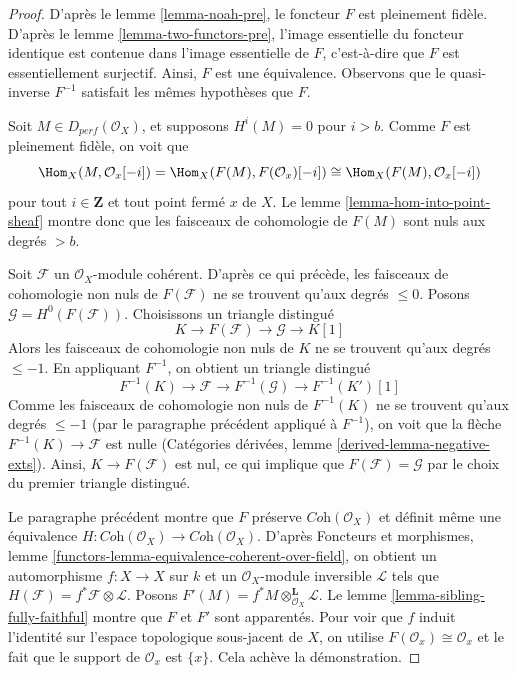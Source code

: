 \begin{proof}
D'après le lemme \ref{lemma-noah-pre}, le foncteur $F$ est pleinement fidèle.
D'après le lemme \ref{lemma-two-functors-pre}, l'image essentielle du
foncteur identique est contenue dans l'image essentielle de $F$, c'est-à-dire
que $F$ est essentiellement surjectif. Ainsi, $F$ est une équivalence.
Observons que le quasi-inverse $F^{-1}$ satisfait les mêmes hypothèses
que $F$.

\medskip\noindent
Soit $M \in D_{perf}(\mathcal{O}_X)$, et supposons $H^i(M) = 0$ pour $i > b$.
Comme $F$ est pleinement fidèle, on voit que
$$
\Hom_X(M, \mathcal{O}_x[-i]) =
\Hom_X(F(M), F(\mathcal{O}_x)[-i]) \cong
\Hom_X(F(M), \mathcal{O}_x[-i])
$$
pour tout $i \in \mathbf{Z}$ et tout point fermé $x$ de $X$.
Le lemme \ref{lemma-hom-into-point-sheaf} montre donc que les faisceaux de cohomologie de $F(M)$
sont nuls aux degrés $> b$.

\medskip\noindent
Soit $\mathcal{F}$ un $\mathcal{O}_X$-module cohérent. D'après
ce qui précède, les faisceaux de cohomologie non nuls de $F(\mathcal{F})$
ne se trouvent qu'aux degrés $\leq 0$.
Posons $\mathcal{G} = H^0(F(\mathcal{F}))$. Choisissons un triangle
distingué
$$
K \to F(\mathcal{F}) \to \mathcal{G} \to K[1]
$$
Alors les faisceaux de cohomologie non nuls de $K$ ne se trouvent qu'aux
degrés $\leq -1$.
En appliquant $F^{-1}$, on obtient un triangle distingué
$$
F^{-1}(K) \to \mathcal{F} \to F^{-1}(\mathcal{G}) \to F^{-1}(K')[1]
$$
Comme les faisceaux de cohomologie non nuls de $F^{-1}(K)$ ne se trouvent qu'aux
degrés $\leq -1$ (par le paragraphe précédent appliqué à $F^{-1}$),
on voit que la flèche $F^{-1}(K) \to \mathcal{F}$ est nulle
(Catégories dérivées, lemme \ref{derived-lemma-negative-exts}).
Ainsi, $K \to F(\mathcal{F})$ est nul, ce qui implique
que $F(\mathcal{F}) = \mathcal{G}$ par le choix du
premier triangle distingué.

\medskip\noindent
Le paragraphe précédent montre que $F$ préserve
$\textit{Coh}(\mathcal{O}_X)$ et définit même une équivalence
$H : \textit{Coh}(\mathcal{O}_X) \to \textit{Coh}(\mathcal{O}_X)$.
D'après Foncteurs et morphismes, lemme
\ref{functors-lemma-equivalence-coherent-over-field},
on obtient un automorphisme $f : X \to X$ sur $k$
et un $\mathcal{O}_X$-module inversible $\mathcal{L}$
tels que $H(\mathcal{F}) = f^*\mathcal{F} \otimes \mathcal{L}$.
Posons $F'(M) = f^*M \otimes_{\mathcal{O}_X}^\mathbf{L} \mathcal{L}$.
Le lemme \ref{lemma-sibling-fully-faithful}
montre que $F$ et $F'$ sont apparentés.
Pour voir que $f$ induit l'identité sur l'espace topologique
sous-jacent de $X$, on utilise $F(\mathcal{O}_x) \cong \mathcal{O}_x$
et le fait que le support de $\mathcal{O}_x$ est $\{x\}$.
Cela achève la démonstration.
\end{proof}

